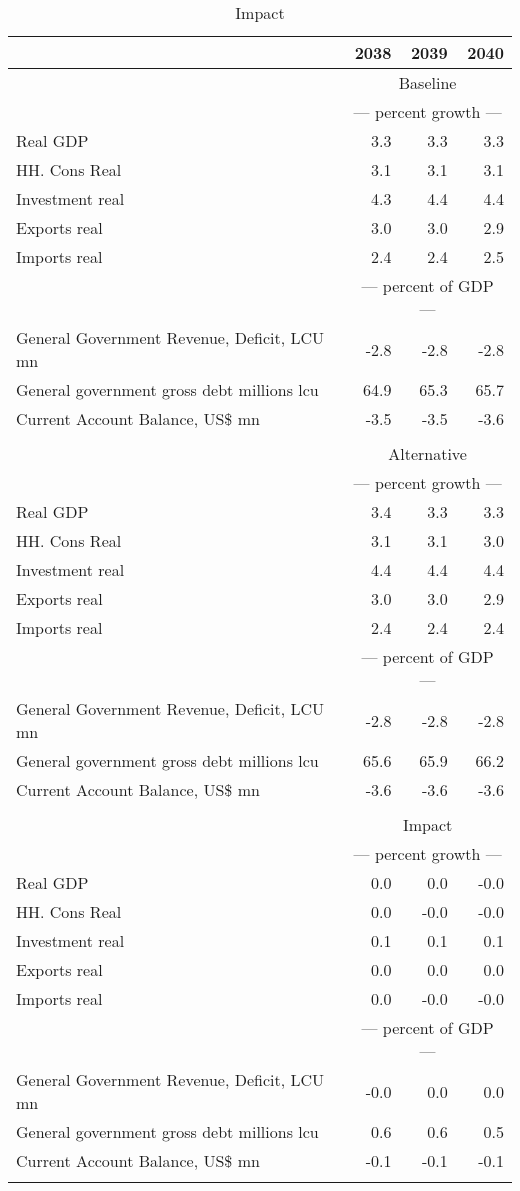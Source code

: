 \documentclass{article}
\begin{document}
 \begin{table}[ht]
\caption{Impact}
\begin{tabular}{lrrr}
\toprule
 & 2038 & 2039 & 2040 \\
\midrule
&\multicolumn{3}{c}{Baseline}       \\
&\multicolumn{3}{c}{--- percent growth ---}       \\
Real GDP & 3.3 & 3.3 & 3.3 \\
HH. Cons Real & 3.1 & 3.1 & 3.1 \\
Investment real & 4.3 & 4.4 & 4.4 \\
Exports real & 3.0 & 3.0 & 2.9 \\
Imports real & 2.4 & 2.4 & 2.5 \\
&\multicolumn{3}{c}{--- percent of GDP ---}       \\
General Government Revenue, Deficit, LCU mn & -2.8 & -2.8 & -2.8 \\
General government gross debt millions lcu & 64.9 & 65.3 & 65.7 \\
Current Account Balance, US\$ mn & -3.5 & -3.5 & -3.6 \\
&\multicolumn{3}{c}{ }       \\
&\multicolumn{3}{c}{Alternative}       \\
&\multicolumn{3}{c}{--- percent growth ---}       \\
Real GDP & 3.4 & 3.3 & 3.3 \\
HH. Cons Real & 3.1 & 3.1 & 3.0 \\
Investment real & 4.4 & 4.4 & 4.4 \\
Exports real & 3.0 & 3.0 & 2.9 \\
Imports real & 2.4 & 2.4 & 2.4 \\
&\multicolumn{3}{c}{--- percent of GDP ---}       \\
General Government Revenue, Deficit, LCU mn & -2.8 & -2.8 & -2.8 \\
General government gross debt millions lcu & 65.6 & 65.9 & 66.2 \\
Current Account Balance, US\$ mn & -3.6 & -3.6 & -3.6 \\
&\multicolumn{3}{c}{ }       \\
&\multicolumn{3}{c}{Impact}       \\
&\multicolumn{3}{c}{--- percent growth ---}       \\
Real GDP & 0.0 & 0.0 & -0.0 \\
HH. Cons Real & 0.0 & -0.0 & -0.0 \\
Investment real & 0.1 & 0.1 & 0.1 \\
Exports real & 0.0 & 0.0 & 0.0 \\
Imports real & 0.0 & -0.0 & -0.0 \\
&\multicolumn{3}{c}{--- percent of GDP ---}       \\
General Government Revenue, Deficit, LCU mn & -0.0 & 0.0 & 0.0 \\
General government gross debt millions lcu & 0.6 & 0.6 & 0.5 \\
Current Account Balance, US\$ mn & -0.1 & -0.1 & -0.1 \\
&\multicolumn{3}{c}{ }       \\
\bottomrule
\end{tabular}
\end{table}
\end{document}
